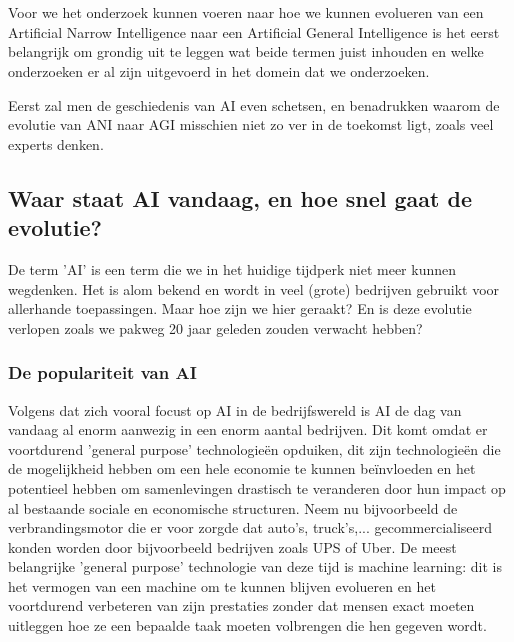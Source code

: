 \chapter{}
\label{ch:Literatuurstudie}



Voor we het onderzoek kunnen voeren naar hoe we kunnen evolueren van een Artificial Narrow Intelligence naar een Artificial General Intelligence is het eerst belangrijk om grondig uit te leggen wat beide termen juist inhouden en welke onderzoeken er al zijn uitgevoerd in het domein dat we onderzoeken.

Eerst zal men de geschiedenis van AI even schetsen, en benadrukken waarom de evolutie van ANI naar AGI misschien niet zo ver in de toekomst ligt, zoals veel experts denken.

\section{Waar staat AI vandaag, en hoe snel gaat de evolutie?}
De term 'AI' is een term die we in het huidige tijdperk niet meer kunnen wegdenken. Het is alom bekend en wordt in veel (grote) bedrijven gebruikt voor allerhande toepassingen. Maar hoe zijn we hier geraakt? En is deze evolutie verlopen zoals we pakweg 20 jaar geleden zouden verwacht hebben?

\subsection{De populariteit van AI}
Volgens \cite{brynjolfsson2017artificial} dat zich vooral focust op AI in de bedrijfswereld is AI de dag van vandaag al enorm aanwezig in een enorm aantal bedrijven. Dit komt omdat er voortdurend 'general purpose' technologieën opduiken, dit zijn technologieën die de mogelijkheid hebben om een hele economie te kunnen beïnvloeden en het potentieel hebben om samenlevingen drastisch te veranderen door hun impact op al bestaande sociale en economische structuren. Neem nu bijvoorbeeld de verbrandingsmotor die er voor zorgde dat auto's, truck's,... gecommercialiseerd konden worden door bijvoorbeeld bedrijven zoals UPS of Uber. De meest belangrijke 'general purpose' technologie van deze tijd is machine learning: dit is het vermogen van een machine om te kunnen blijven evolueren en het voortdurend verbeteren van zijn prestaties zonder dat mensen exact moeten uitleggen hoe ze een bepaalde taak moeten volbrengen die hen gegeven wordt. 

